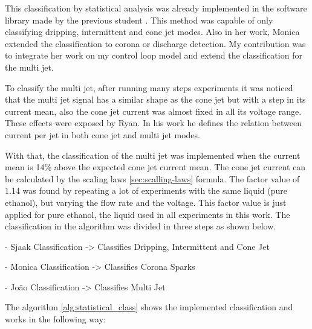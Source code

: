  

This classification by statistical analysis was already implemented in the software library made by the previous student \cite{Monica}.
This method was capable of only classifying dripping, intermittent and cone jet modes. Also in her work, Monica extended the classification to corona or discharge detection.
My contribution was to integrate her work on my control loop model and extend the classification for the multi jet.

To classify the multi jet, after running many steps experiments it was noticed that the multi jet signal has a similar shape as the cone jet but with a step in its current mean, also the cone jet current was almost fixed in all its voltage range. 
These effects were exposed by Ryan\cite{Ryan}. In his work he defines the relation between current per jet in both cone jet and multi jet modes.

With that, the classification of the multi jet was implemented  when the current mean is 14\% above the expected cone jet current mean. 
The cone jet current can be calculated by the scaling laws \ref{sec:scalling-laws} formula.
The factor value of 1.14 was found by repeating a lot of experiments with the same liquid (pure ethanol), but varying the flow rate and the voltage. This factor value is just applied for pure ethanol, the liquid used in all experiments in this work.
The classification in the algorithm was divided in three steps as shown below.

        - Sjaak Classification -> Classifies Dripping, Intermittent and Cone Jet
        
        - Monica Classification -> Classifies Corona Sparks

        - João Classification -> Classifies Multi Jet

	The algorithm \ref{alg:statistical_class} shows the implemented classification and works in the following way:

